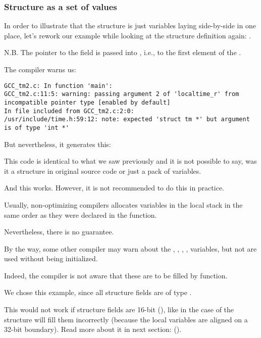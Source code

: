 ﻿\subsubsection{Structure as a set of values}

In order to illustrate that the structure is just variables laying side-by-side in one place, 
let's rework our example while looking at the  structure definition again: .



N.B. 
The pointer to the  field is passed into , i.e., 
to the first element of the .

The compiler warns us:

\begin{lstlisting}[caption=GCC 4.7.3]
GCC_tm2.c: In function 'main':
GCC_tm2.c:11:5: warning: passing argument 2 of 'localtime_r' from incompatible pointer type [enabled by default]
In file included from GCC_tm2.c:2:0:
/usr/include/time.h:59:12: note: expected 'struct tm *' but argument is of type 'int *'
\end{lstlisting}

But nevertheless, it generates this:



This code is identical to what we saw previously and it is
not possible to say, was it a structure in original source code or just a pack of variables.

And this works. 
However, it is not recommended to do this in practice. 

Usually, non-optimizing compilers allocates variables in the local stack in the 
same order as they were declared in the function.

Nevertheless, there is no guarantee.

By the way, some other compiler may warn about the , , ,
,  variables, but not 
 are used without being initialized.

Indeed, the compiler is not aware that these are to be filled by 
 function.

We chose this example, since all structure fields are of type \Tint.%

This would not work if structure fields are 16-bit (), 
like in the case of the  structure\EMDASH{} 
will fill them incorrectly 
(because the local variables are aligned on a 32-bit boundary).
Read more about it in next section: 
\q{\StructurePackingSectionName} ().

